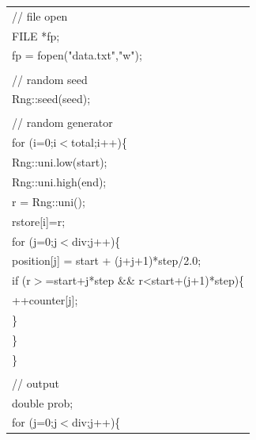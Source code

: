 \clearpage

{\footnotesize
\begin{center}
\begin{tabular}{|l|}\hline
\hspace*{10mm}// file open\\
\hspace*{10mm}FILE *fp;\\
\hspace*{10mm}fp = fopen("data.txt","w");\\
\\
\hspace*{10mm}// random seed\\
\hspace*{10mm}Rng::seed(seed);\\
\\
\hspace*{10mm}// random generator\\
\hspace*{10mm}for (i=0;i$<$total;i++)\{\\
\hspace*{20mm}Rng::uni.low(start);\\
\hspace*{20mm}Rng::uni.high(end);\\
\hspace*{20mm}r = Rng::uni();\\
\hspace*{20mm}rstore[i]=r;\\
\hspace*{20mm}for (j=0;j$<$div;j++)\{\\
\hspace*{30mm}position[j] = start + (j+j+1)*step/2.0;\\
\hspace*{30mm}if (r$>$=start+j*step \&\& r<start+(j+1)*step)\{\\
\hspace*{40mm}++counter[j];\\
\hspace*{30mm}\}\\
\hspace*{20mm}\}\\
\hspace*{10mm}\}\\
\\
\hspace*{10mm}// output\\
\hspace*{10mm}double prob;\\
\hspace*{10mm}for (j=0;j$<$div;j++)\{\\

\end{tabular}
\end{center}}
